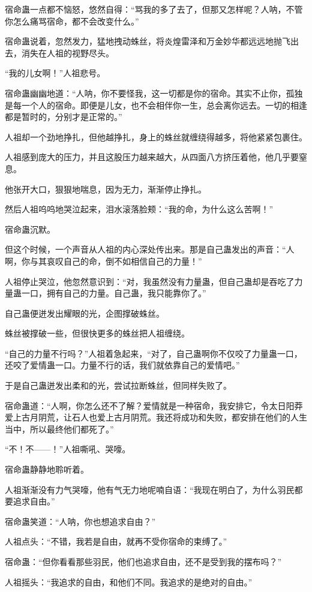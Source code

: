 \begin{this_body}
宿命蛊一点都不恼怒，悠然自得：“骂我的多了去了，但那又怎样呢？人呐，不管你怎么痛骂宿命，都不会改变什么。”

宿命蛊说着，忽然发力，猛地拽动蛛丝，将炎煌雷泽和万金妙华都远远地抛飞出去，消失在人祖的视野尽头。

“我的儿女啊！”人祖悲号。

宿命蛊幽幽地道：“人呐，你不要怪我，这一切都是你的宿命。其实不止你，孤独是每一个人的宿命。即便是儿女，也不会相伴你一生，总会离你远去。一切的相逢都是暂时的，分别才是正常的。”

人祖却一个劲地挣扎，但他越挣扎，身上的蛛丝就缠绕得越多，将他紧紧包裹住。

人祖感到庞大的压力，并且这股压力越来越大，从四面八方挤压着他，他几乎要窒息。

他张开大口，狠狠地喘息，因为无力，渐渐停止挣扎。

然后人祖呜呜地哭泣起来，泪水滚落脸颊：“我的命，为什么这么苦啊！”

宿命蛊沉默。

但这个时候，一个声音从人祖的内心深处传出来。那是自己蛊发出的声音：“人啊，你与其哀叹自己的命，倒不如相信自己的力量！”

人祖停止哭泣，他忽然意识到：“对，我虽然没有力量蛊，但自己蛊却是吞吃了力量蛊一口，拥有自己的力量。自己蛊，我只能靠你了。”

自己蛊便迸发出耀眼的光，企图撑破蛛丝。

蛛丝被撑破一些，但很快更多的蛛丝把人祖缠绕。

“自己的力量不行吗？”人祖着急起来，“对了，自己蛊啊你不仅咬了力量蛊一口，还咬了爱情蛊一口。力量不行的话，我们就依靠自己的爱情吧。”

于是自己蛊迸发出柔和的光，尝试拉断蛛丝，但同样失败了。

宿命蛊道：“人啊，你怎么还不了解？爱情就是一种宿命，我安排它，令太日阳莽爱上古月阴荒，让石人也爱上古月阴荒。我还将成功和失败，都安排在他们的人生当中，所以最终他们都死了。”

“不！不——！”人祖嘶吼、哭嚎。

宿命蛊静静地聆听着。

人祖渐渐没有力气哭嚎，他有气无力地呢喃自语：“我现在明白了，为什么羽民都要追求自由。”

宿命蛊笑道：“人呐，你也想追求自由？”

人祖点头：“不错，我若是自由，就再不受你宿命的束缚了。”

宿命蛊：“但你看看那些羽民，他们也追求自由，还不是受到我的摆布吗？”

人祖摇头：“我追求的自由，和他们不同。我追求的是绝对的自由。”


\end{this_body}
